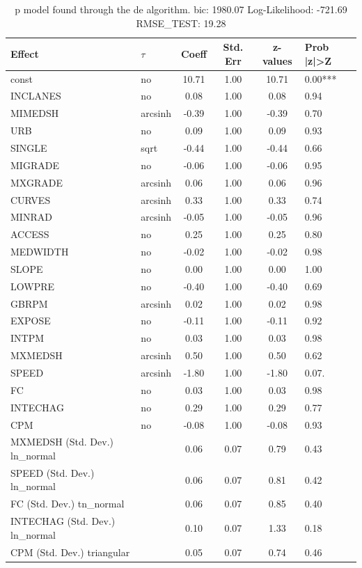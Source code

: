 \begin{table}
	\caption{p model found through the de algorithm. bic: 1980.07 Log-Likelihood: -721.69 RMSE_TEST: 19.28}
	\begin{center}
		\begin{tabular}{|l|l|c|c|c|l|}
			\hline
			Effect & $\tau$ & Coeff & Std. Err & z-values & Prob |z|>Z \\
			\hline
			const & no & 10.71 & 1.00 & 10.71 & 0.00*** \\
			\hline
			INCLANES & no & 0.08 & 1.00 & 0.08 & 0.94 \\
			\hline
			MIMEDSH & arcsinh & -0.39 & 1.00 & -0.39 & 0.70 \\
			\hline
			URB & no & 0.09 & 1.00 & 0.09 & 0.93 \\
			\hline
			SINGLE & sqrt & -0.44 & 1.00 & -0.44 & 0.66 \\
			\hline
			MIGRADE & no & -0.06 & 1.00 & -0.06 & 0.95 \\
			\hline
			MXGRADE & arcsinh & 0.06 & 1.00 & 0.06 & 0.96 \\
			\hline
			CURVES & arcsinh & 0.33 & 1.00 & 0.33 & 0.74 \\
			\hline
			MINRAD & arcsinh & -0.05 & 1.00 & -0.05 & 0.96 \\
			\hline
			ACCESS & no & 0.25 & 1.00 & 0.25 & 0.80 \\
			\hline
			MEDWIDTH & no & -0.02 & 1.00 & -0.02 & 0.98 \\
			\hline
			SLOPE & no & 0.00 & 1.00 & 0.00 & 1.00 \\
			\hline
			LOWPRE & no & -0.40 & 1.00 & -0.40 & 0.69 \\
			\hline
			GBRPM & arcsinh & 0.02 & 1.00 & 0.02 & 0.98 \\
			\hline
			EXPOSE & no & -0.11 & 1.00 & -0.11 & 0.92 \\
			\hline
			INTPM & no & 0.03 & 1.00 & 0.03 & 0.98 \\
			\hline
			MXMEDSH & arcsinh & 0.50 & 1.00 & 0.50 & 0.62 \\
			\hline
			SPEED & arcsinh & -1.80 & 1.00 & -1.80 & 0.07. \\
			\hline
			FC & no & 0.03 & 1.00 & 0.03 & 0.98 \\
			\hline
			INTECHAG & no & 0.29 & 1.00 & 0.29 & 0.77 \\
			\hline
			CPM & no & -0.08 & 1.00 & -0.08 & 0.93 \\
			\hline
			MXMEDSH (Std. Dev.) ln_normal &  & 0.06 & 0.07 & 0.79 & 0.43 \\
			\hline
			SPEED (Std. Dev.) ln_normal &  & 0.06 & 0.07 & 0.81 & 0.42 \\
			\hline
			FC (Std. Dev.) tn_normal &  & 0.06 & 0.07 & 0.85 & 0.40 \\
			\hline
			INTECHAG (Std. Dev.) ln_normal &  & 0.10 & 0.07 & 1.33 & 0.18 \\
			\hline
			CPM (Std. Dev.) triangular &  & 0.05 & 0.07 & 0.74 & 0.46 \\
			\hline
		\end{tabular}
	\end{center}
\end{table}